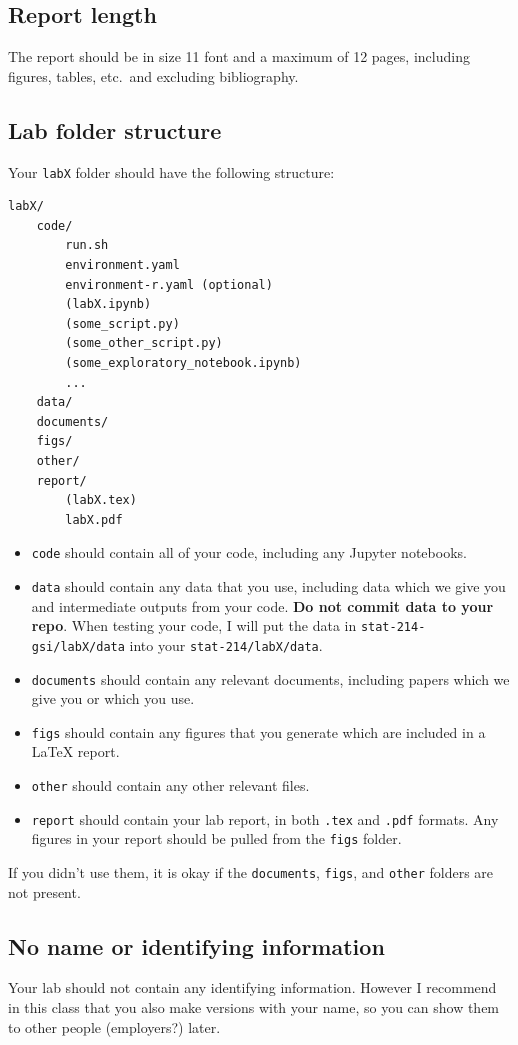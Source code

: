 \documentclass[letterpaper,12pt]{article}
\begin{document}
\subsection{Report length}
The report should be in size 11 font and a maximum of 12 pages, including figures, tables, etc.~and excluding bibliography.

\subsection{Lab folder structure}

Your \texttt{labX} folder should have the following structure:
\begin{verbatim}
labX/
    code/
        run.sh
        environment.yaml
        environment-r.yaml (optional)
        (labX.ipynb)
        (some_script.py)
        (some_other_script.py)
        (some_exploratory_notebook.ipynb)
        ...
    data/
    documents/
    figs/
    other/
    report/
        (labX.tex)
        labX.pdf
\end{verbatim}
\begin{itemize}
    \item \texttt{code} should contain all of your code, including any Jupyter notebooks.
    \item  \texttt{data} should contain any data that you use, including data which we give you and intermediate outputs from your code. \textbf{Do not commit data to your repo}. When testing your code, I will put the data in \texttt{stat-214-gsi/labX/data} into your \texttt{stat-214/labX/data}.
    \item \texttt{documents} should contain any relevant documents, including papers which we give you or which you use.
    \item \texttt{figs} should contain any figures that you generate which are included in a LaTeX report.
    \item \texttt{other} should contain any other relevant files.
    \item \texttt{report} should contain your lab report, in both \texttt{.tex} and \texttt{.pdf} formats. Any figures in your report should be pulled from the \texttt{figs} folder.
\end{itemize}
If you didn't use them, it is okay if the \texttt{documents}, \texttt{figs}, and \texttt{other} folders are not present.

\subsection{No name or identifying information}
Your lab should not contain any identifying information. However I recommend in this class that you also make versions with your name, so you can show them to other people (employers?) later.
\end{document}
